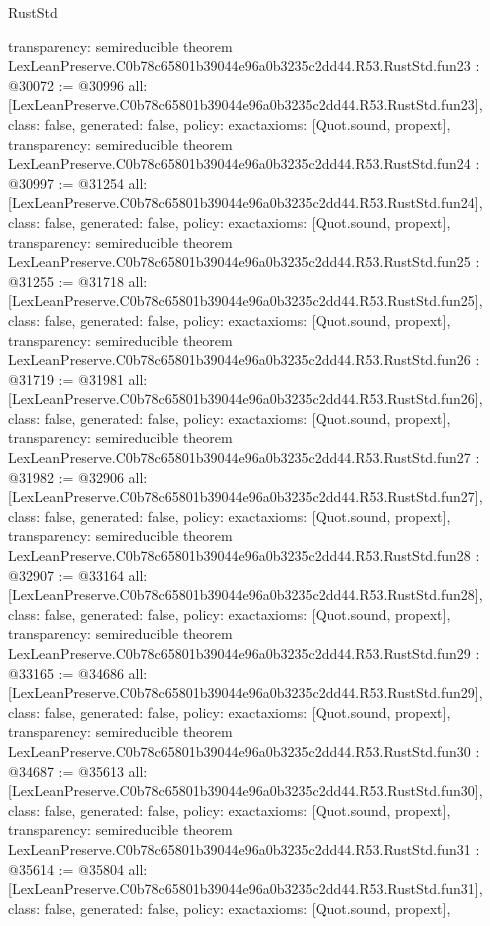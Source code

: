 \begin{lexlean}{RustStd}
\begin{coremodule}
{  transparency: semireducible
}
theorem LexLeanPreserve.C0b78c65801b39044e96a0b3235c2dd44.R53.RustStd.fun23 : @30072 := @30996 {
  all: [LexLeanPreserve.C0b78c65801b39044e96a0b3235c2dd44.R53.RustStd.fun23],
  class: false,
  generated: false,
  policy: exact{axioms: [Quot.sound, propext]},
  transparency: semireducible
}
theorem LexLeanPreserve.C0b78c65801b39044e96a0b3235c2dd44.R53.RustStd.fun24 : @30997 := @31254 {
  all: [LexLeanPreserve.C0b78c65801b39044e96a0b3235c2dd44.R53.RustStd.fun24],
  class: false,
  generated: false,
  policy: exact{axioms: [Quot.sound, propext]},
  transparency: semireducible
}
theorem LexLeanPreserve.C0b78c65801b39044e96a0b3235c2dd44.R53.RustStd.fun25 : @31255 := @31718 {
  all: [LexLeanPreserve.C0b78c65801b39044e96a0b3235c2dd44.R53.RustStd.fun25],
  class: false,
  generated: false,
  policy: exact{axioms: [Quot.sound, propext]},
  transparency: semireducible
}
theorem LexLeanPreserve.C0b78c65801b39044e96a0b3235c2dd44.R53.RustStd.fun26 : @31719 := @31981 {
  all: [LexLeanPreserve.C0b78c65801b39044e96a0b3235c2dd44.R53.RustStd.fun26],
  class: false,
  generated: false,
  policy: exact{axioms: [Quot.sound, propext]},
  transparency: semireducible
}
theorem LexLeanPreserve.C0b78c65801b39044e96a0b3235c2dd44.R53.RustStd.fun27 : @31982 := @32906 {
  all: [LexLeanPreserve.C0b78c65801b39044e96a0b3235c2dd44.R53.RustStd.fun27],
  class: false,
  generated: false,
  policy: exact{axioms: [Quot.sound, propext]},
  transparency: semireducible
}
theorem LexLeanPreserve.C0b78c65801b39044e96a0b3235c2dd44.R53.RustStd.fun28 : @32907 := @33164 {
  all: [LexLeanPreserve.C0b78c65801b39044e96a0b3235c2dd44.R53.RustStd.fun28],
  class: false,
  generated: false,
  policy: exact{axioms: [Quot.sound, propext]},
  transparency: semireducible
}
theorem LexLeanPreserve.C0b78c65801b39044e96a0b3235c2dd44.R53.RustStd.fun29 : @33165 := @34686 {
  all: [LexLeanPreserve.C0b78c65801b39044e96a0b3235c2dd44.R53.RustStd.fun29],
  class: false,
  generated: false,
  policy: exact{axioms: [Quot.sound, propext]},
  transparency: semireducible
}
theorem LexLeanPreserve.C0b78c65801b39044e96a0b3235c2dd44.R53.RustStd.fun30 : @34687 := @35613 {
  all: [LexLeanPreserve.C0b78c65801b39044e96a0b3235c2dd44.R53.RustStd.fun30],
  class: false,
  generated: false,
  policy: exact{axioms: [Quot.sound, propext]},
  transparency: semireducible
}
theorem LexLeanPreserve.C0b78c65801b39044e96a0b3235c2dd44.R53.RustStd.fun31 : @35614 := @35804 {
  all: [LexLeanPreserve.C0b78c65801b39044e96a0b3235c2dd44.R53.RustStd.fun31],
  class: false,
  generated: false,
  policy: exact{axioms: [Quot.sound, propext]},
}
\end{coremodule}
\end{lexlean}
